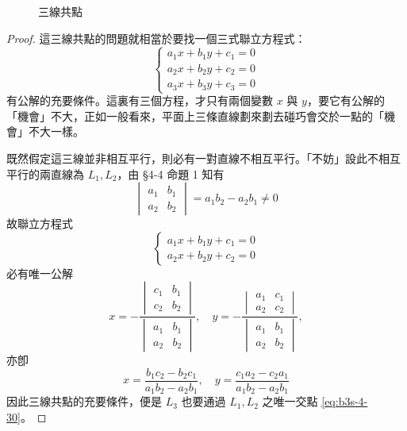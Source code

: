 \begin{figure}[H]
\centering
{}
\caption{三線共點}
\label{fig:4-40}
\end{figure}

\begin{proof}
這三線共點的問題就相當於要找一個三式聯立方程式：
\begin{equation*}
\begin{cases}
a_1 x + b_1 y + c_1 = 0 \\
a_2 x + b_2 y + c_2 = 0 \\
a_3 x + b_3 y + c_3 = 0
\end{cases}
\end{equation*}
有公解的充要條件。這裏有三個方程，才只有兩個變數 $x$ 與 $y$，要它有公解的「機會」不大，正如一般看來，平面上三條直線劃來劃去碰巧會交於一點的「機會」不大一樣。

既然假定這三線並非相互平行，則必有一對直線不相互平行。「不妨」設此不相互平行的兩直線為 $L_1, L_2$，由 \S 4-4 命題 1 知有
\[
\begin{vmatrix}
a_1 & b_1 \\
a_2 & b_2
\end{vmatrix} = a_1 b_2 - a_2 b_1 \neq 0
\]
故聯立方程式
\[
\begin{cases}
a_1 x + b_1 y + c_1 = 0 \\
a_2 x + b_2 y + c_2 = 0
\end{cases}
\]
必有唯一公解
\[
x = -\frac{\begin{vmatrix} c_1 & b_1 \\ c_2 & b_2 \end{vmatrix}}{\begin{vmatrix} a_1 & b_1 \\ a_2 & b_2 \end{vmatrix}}, \quad
y = -\frac{\begin{vmatrix} a_1 & c_1 \\ a_2 & c_2 \end{vmatrix}}{\begin{vmatrix} a_1 & b_1 \\ a_2 & b_2 \end{vmatrix}},
\]
亦卽
\begin{equation}
x = \frac{b_1 c_2 - b_2 c_1}{a_1 b_2 - a_2 b_1}, \quad y = \frac{c_1 a_2 - c_2 a_1}{a_1 b_2 - a_2 b_1}
\label{eq:b3s-4-30}
\end{equation}
因此三線共點的充要條件，便是 $L_3$ 也要通過 $L_1, L_2$ 之唯一交點 \eqref{eq:b3s-4-30}。


\end{proof}
